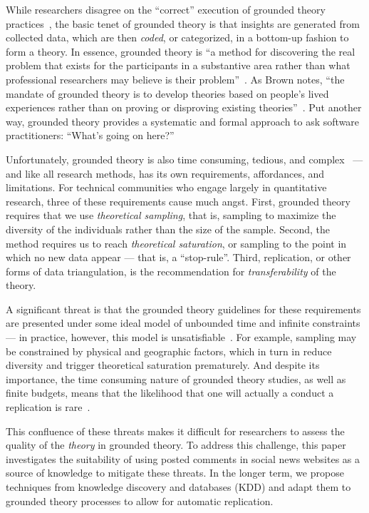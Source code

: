 \documentclass{sig-alternate}
\begin{document}
While researchers disagree on the ``correct'' execution of grounded theory practices~\cite{Suddaby2006}, the basic tenet of grounded theory is that insights are generated from collected data, which are then \textit{coded}, or categorized, in a bottom-up fashion to form a theory. In essence, grounded theory is ``a method for discovering the real problem that exists for the participants in a substantive area rather than what professional researchers may believe is their problem''~\cite{Adolph2008}. As Brown notes, ``the mandate of grounded theory is to develop theories based on people's lived experiences rather than on proving or disproving existing theories''~\cite{brown2012daring}. Put another way, grounded theory provides a systematic and formal approach to ask software practitioners: ``What's going on here?''

Unfortunately, grounded theory is also time consuming, tedious, and complex~\cite{Olson2014} --- and like all research methods, has its own requirements, affordances, and limitations. For technical communities who engage largely in quantitative research, three of these requirements cause much angst. First, grounded theory requires that we use \textit{theoretical sampling}, that is, sampling to maximize the diversity of the individuals rather than the size of the sample. Second, the method requires us to reach \textit{theoretical saturation}, or sampling to the point in which no new data appear --- that is, a ``stop-rule''. Third, replication, or other forms of data triangulation, is the recommendation for \textit{transferability} of the theory.

A significant threat is that the grounded theory guidelines for these requirements are presented under some ideal model of unbounded time and infinite constraints --- in practice, however, this model is unsatisfiable~\cite{Baker2012,Mason2010}. For example, sampling may be constrained by physical and geographic factors, which in turn in reduce diversity and trigger theoretical saturation prematurely. And despite its importance, the time consuming nature of grounded theory studies, as well as finite budgets, means that the likelihood that one will actually a conduct a replication is rare~\cite{Shull2008b}.

This confluence of these threats makes it difficult for researchers to assess the quality of the \textit{theory} in grounded theory. To address this challenge, this paper investigates the suitability of using posted comments in social news websites as a source of knowledge to mitigate these threats. In the longer term, we propose techniques from knowledge discovery and databases (KDD) and adapt them to grounded theory processes to allow for automatic replication.
\end{document}
